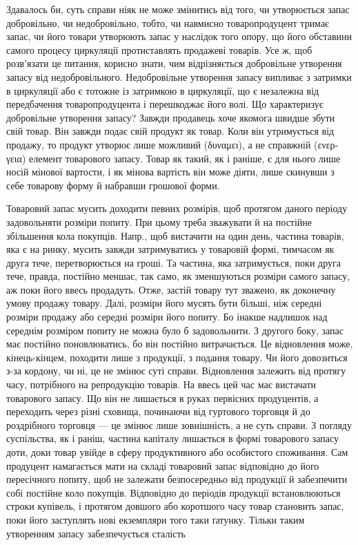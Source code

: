 Здавалось би, суть справи ніяк не може змінитись від того, чи утворюється
запас добровільно, чи недобровільно, тобто, чи навмисно товаропродуцент
тримає запас, чи його товари утворюють запас у наслідок того опору, що його
обставини самого процесу циркуляції протиставлять продажеві товарів. Усе
ж, щоб розв’язати це питання, корисно знати, чим відрізняється добровільне
утворення запасу від недобровільного. Недобровільне утворення запасу
випливає з затримки в циркуляції або є тотожне із затримкою в циркуляції,
що є незалежна від передбачення товаропродуцента і перешкоджає його
волі. Що характеризує добровільне утворення запасу? Завжди продавець
хоче якомога швидше збути свій товар. Він завжди подає свій продукт як
товар. Коли він утримується від продажу, то продукт утворює лише можливий
(\textgreek{δυναμει}), а не справжній (\textgreek{ενεργεια}) елемент товарового запасу.
Товар як такий, як і раніше, є для нього лише носій мінової вартости,
і як мінова вартість він може діяти, лише скинувши з себе товарову
форму й набравши грошової форми.

Товаровий запас мусить доходити певних розмірів, щоб протягом
даного періоду задовольняти розміри попиту. При цьому треба зважувати
й на постійне збільшення кола покупців. Напр., щоб вистачити на один день,
частина товарів, яка є на ринку, мусить завжди затримуватись у товаровій
формі, тимчасом як друга тече, перетворюється на гроші. Та частина,
яка затримується, поки друга тече, правда, постійно меншає, так само,
як зменшуються розміри самого запасу, аж поки його ввесь продадуть.
Отже, застій товару тут зважено, як доконечну умову продажу
товару. Далі, розміри його мусять бути більші, ніж середні розміри
продажу або середні розміри його попиту. Бо інакше надлишок над
середнім розміром попиту не можна було б задовольнити. З другого боку,
запас має постійно поновлюватись, бо він постійно витрачається. Це
відновлення може, кінець-кінцем, походити лише з продукції, з подання
товару. Чи його довозиться з-за кордону, чи ні, це не змінює суті
справи. Відновлення залежить від протягу часу, потрібного на репродукцію
товарів. На ввесь цей час має вистачати товарового запасу. Що
він не лишається в руках первісних продуцентів, а переходить через різні
сховища, починаючи від гуртового торговця й до роздрібного торговця
— це змінює лише зовнішність, а не суть справи. З погляду суспільства,
як і раніш, частина капіталу лишається в формі товарового запасу доти,
доки товар увійде в сферу продуктивного або особистого споживання. Сам
продуцент намагається мати на складі товаровий запас відповідно до його
пересічного попиту, щоб не залежати безпосередньо від продукції й
забезпечити собі постійне коло покупців. Відповідно до періодів продукції
встановлюються строки купівель, і протягом довшого або коротшого
часу товар становить запас, поки його заступлять нові екземпляри того
таки ґатунку. Тільки таким утворенням запасу забезпечується сталість
\parbreak{}  %
